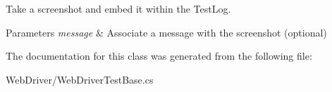 Take a screenshot and embed it within the Test\-Log. 


\begin{DoxyParams}{Parameters}
{\em message} & Associate a message with the screenshot (optional)\\
\hline
\end{DoxyParams}


The documentation for this class was generated from the following file\-:\begin{DoxyCompactItemize}
\item 
Web\-Driver/Web\-Driver\-Test\-Base.\-cs\end{DoxyCompactItemize}

